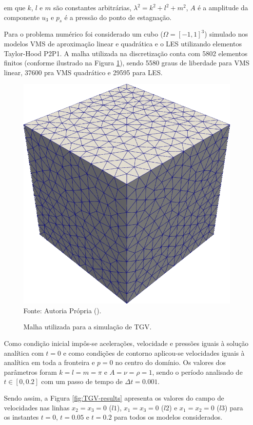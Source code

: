 \noindent em que $k$, $l$ e $m$ são constantes arbitrárias, $\lambda^2=k^2+l^2+m^2$, $A$ é a amplitude da componente $u_3$ e $p_s$ é a pressão do ponto de estagnação.

Para o problema numérico foi considerado um cubo ($\Omega=[-1,1]^3$) simulado nos modelos VMS de aproximação linear e quadrática e o LES utilizando elementos Taylor-Hood P2P1. A malha utilizada na discretização conta com 5802 elementos finitos (conforme ilustrado na Figura \ref{fig:TGV-mesh}), sendo 5580 graus de liberdade para VMS linear, 37600 pra VMS quadrático e 29595 para LES.

\begin{figure}[h!]
    \centering
    \caption{Malha utilizada para a simulação de TGV.}
    \includegraphics[width=0.4\linewidth]{Figuras/taylor-green/mesh.png}
    \\Fonte: Autoria Própria (\the\year).
    \label{fig:TGV-mesh}
\end{figure}

Como condição inicial impôs-se acelerações, velocidade e pressões iguais à solução analítica com $t=0$ e como condições de contorno aplicou-se velocidades iguais à analítica em toda a fronteira e $p=0$ no centro do domínio. Os valores dos parâmetros foram $k=l=m=\pi$ e $A=\nu=\rho=1$, sendo o período analisado de $t\in[0,0.2]$ com um passo de tempo de $\Delta t=0.001$.

Sendo assim, a Figura \ref{fig:TGV-results} apresenta os valores do campo de velocidades nas linhas $x_2=x_3=0$ ($l1$), $x_1=x_3=0$ ($l2$) e $x_1=x_2=0$ ($l3$) para os instantes $t=0$, $t=0.05$ e $t=0.2$ para todos os modelos considerados.

